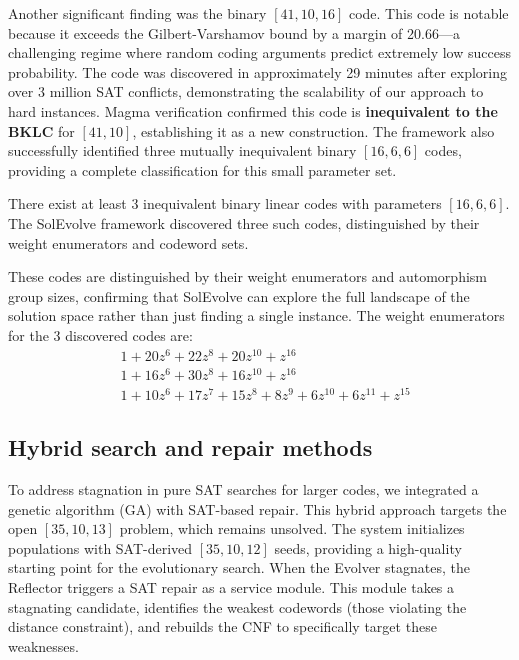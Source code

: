 Another significant finding was the binary $[41,10,16]$ code. This code is notable because it exceeds the Gilbert-Varshamov bound by a margin of 20.66---a challenging regime where random coding arguments predict extremely low success probability. The code was discovered in approximately 29 minutes after exploring over 3 million SAT conflicts, demonstrating the scalability of our approach to hard instances. Magma verification confirmed this code is \textbf{inequivalent to the BKLC} for $[41,10]$, establishing it as a new construction. The framework also successfully identified three mutually inequivalent binary $[16,6,6]$ codes, providing a complete classification for this small parameter set.

\begin{remark}
There exist at least 3 inequivalent binary linear codes with parameters $[16,6,6]$. The SolEvolve framework discovered three such codes, distinguished by their weight enumerators and codeword sets.
\end{remark}
These codes are distinguished by their weight enumerators and automorphism group sizes, confirming that SolEvolve can explore the full landscape of the solution space rather than just finding a single instance.
The weight enumerators for the 3 discovered codes are:
\begin{align*}
    & 1 + 20z^6 + 22z^8 + 20z^{10} + z^{16} \\
    & 1 + 16z^6 + 30z^8 + 16z^{10} + z^{16} \\
    & 1 + 10z^6 + 17z^7 + 15z^8 + 8z^9 + 6z^{10} + 6z^{11} + z^{15}
\end{align*}


\subsection{Hybrid search and repair methods}
To address stagnation in pure SAT searches for larger codes, we integrated a genetic algorithm (GA) with SAT-based repair. This hybrid approach targets the open $[35,10,13]$ problem, which remains unsolved. The system initializes populations with SAT-derived $[35,10,12]$ seeds, providing a high-quality starting point for the evolutionary search. When the Evolver stagnates, the Reflector triggers a SAT repair as a service module. This module takes a stagnating candidate, identifies the weakest codewords (those violating the distance constraint), and rebuilds the CNF to specifically target these weaknesses.

